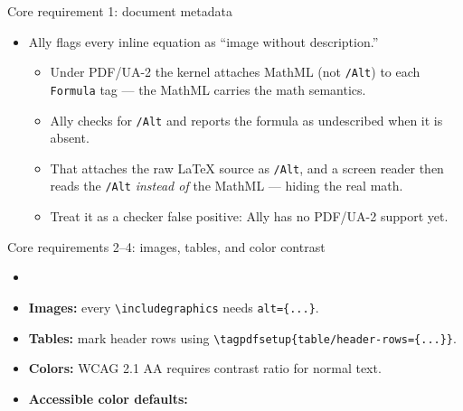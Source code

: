 \begin{frame}{Core requirement 1: document metadata}
\begin{itemize}
  \bigskip
  
\item {} Ally flags every inline equation as ``image without description.''
  \begin{itemize}
  \item Under PDF/UA-2 the kernel attaches MathML (not \texttt{/Alt}) to each \texttt{Formula} tag --- the MathML carries the math semantics.
    \item Ally checks for \texttt{/Alt} and reports the formula as undescribed when it is absent.
  \item {} That attaches the raw \LaTeX{} source as \texttt{/Alt}, and a screen reader then reads the \texttt{/Alt} \emph{instead of} the MathML --- hiding the real math.
  \item Treat it as a checker false positive: Ally has no PDF/UA-2 support yet.
  \end{itemize}
  
\end{itemize}
\end{frame}

\begin{frame}{Core requirements 2--4: images, tables, and color contrast}
\begin{itemize}
\item {}

\bigskip

\item \textbf{Images:} every \texttt{\textbackslash includegraphics} needs \texttt{alt=\{...\}}.
\item \textbf{Tables:} mark header rows using \texttt{\textbackslash tagpdfsetup\{table/header-rows=\{...\}\}}.
\item \textbf{Colors:} WCAG 2.1 AA requires  contrast ratio for normal text.
\bigskip

\item \textbf{Accessible color defaults:}

\medskip  
  
\end{itemize}
\end{frame}


